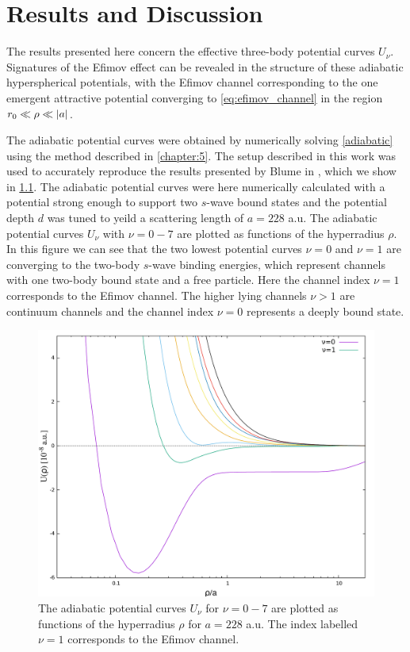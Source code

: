 \chapter{Results and Discussion}
The results presented here concern the effective three-body potential curves $U_{\nu}$. Signatures of the Efimov effect can be revealed in the structure of these adiabatic hyperspherical potentials, with the Efimov channel corresponding to the one emergent attractive potential converging to \eqref{eq:efimov_channel} in the region $r_0 \ll \rho \ll
\lvert a\rvert$.

The adiabatic potential curves were obtained by numerically solving  \eqref{adiabatic} using the method described in \cref{chapter:5}. The setup described in this work was used to accurately reproduce the results presented by Blume in \cite{Blume2002}, which we show in \cref{fig:res_2}. The adiabatic potential curves were here numerically calculated with a potential strong enough to support two $s$-wave bound states and the potential depth $d$ was tuned to yeild a scattering length of $a=228$ a.u. The adiabatic potential curves $U_{\nu}$ with $\nu = 0-7$ are plotted as functions of the hyperradius $\rho$. In this figure we can see that the two lowest potential curves $\nu = 0$ and $\nu = 1$ are converging to the two-body $s$-wave binding energies, which represent channels with one two-body bound  state and a free particle. Here the channel index $\nu=1$ corresponds to the Efimov channel. The higher lying channels $\nu>1$ are continuum channels and the channel index $\nu=0$ represents a deeply bound state.

\begin{figure}
	\includegraphics[width=\linewidth]{adiabatic.pdf}
	\caption{The adiabatic potential curves $U_{\nu}$ for $\nu=0-7$ are plotted as functions of the hyperradius $\rho$ for $a=228$ a.u. The index labelled $\nu=1$ corresponds to the Efimov channel.}
	\label{fig:res_2}
\end{figure}

